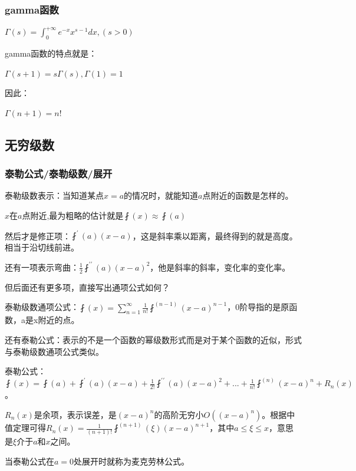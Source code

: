 \documentclass[UTF8]{ctexbook}
\newcommand{\derivative}{^\prime}
\newcommand{\doubleDerivative}{^{\prime\prime}}
\newcommand{\aLotDerivative}[1]{^{(#1)}}
\newcommand{\upDownSum}[2]{\sum\limits_{#2}^{#1}}
\newcommand{\fDerivative}[1]{\fint\derivative(#1)}
\newcommand{\defFunction}[1]{\fint(#1)}
\newcommand{\definiteIntegral}[2]{\int^{#1}_{#2}}
\begin{document}
{{{\subsubsection{gamma函数}{
$\varGamma(s) = \definiteIntegral{+\infty}{0}e^{-x}x^{s-1}dx, (s > 0)$

gamma函数的特点就是：

$\varGamma(s + 1) = s\varGamma(s), \varGamma(1) = 1$

因此：

$\varGamma(n+1) = n!$

}%

}%

\subsection{无穷级数}{

\subsubsection{泰勒公式/泰勒级数/展开}{
泰勒级数表示：当知道某点$x = a$的情况时，就能知道$a$点附近的函数是怎样的。

$x$在$a$点附近,最为粗略的估计就是$\defFunction{x} \approx \defFunction{a}$

然后才是修正项：$\fDerivative{a}(x - a)$，这是斜率乘以距离，最终得到的就是高度。相当于沿切线前进。

还有一项表示弯曲：$\frac{1}{2}\fint\doubleDerivative(a)(x - a)^2$，他是斜率的斜率，变化率的变化率。

但后面还有更多项，直接写出通项公式如何？

泰勒级数通项公式：$\defFunction{x} = \upDownSum{\infty}{n = 1}\frac{1}{n!}\fint\aLotDerivative{n - 1}(x - a)^{n - 1}$，0阶导指的是原函数，a是x附近的点。

还有泰勒公式：表示的不是一个函数的幂级数形式而是对于某个函数的近似，形式与泰勒级数通项公式类似。

泰勒公式：$\defFunction{x} = \defFunction{a} + \fDerivative{a}(x - a) + \frac{1}{2!}\fint\doubleDerivative(a)(x - a)^2 + ... + \frac{1}{n!}\fint\aLotDerivative{n}(x - a)^n + R_n(x)$。

$R_n(x)$是余项，表示误差，是$(x - a)^n$的高阶无穷小$O((x - a)^n)$。根据中值定理可得$R_n(x) = \frac{1}{(n + 1)!}\fint\aLotDerivative{n + 1}(\xi)(x - a)^{n+1}$，其中$a \leq \xi \leq x$，意思是$\xi$介于$a$和$x$之间。

当泰勒公式在$a = 0$处展开时就称为麦克劳林公式。

}}}}
\end{document}
